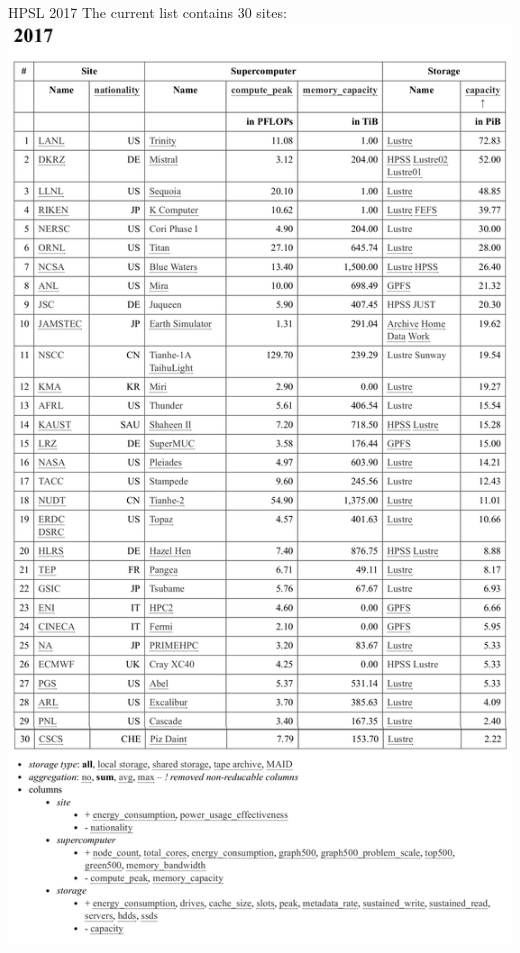 \documentclass[portrait,a0paper,fontscale=0.4]{baposter}
\begin{document}
\begin{poster}
\begin{posterbox}[name=engineering,column=3]{HPSL 2017}
The current list contains 30 sites:
\includegraphics[width=\textwidth]{hpsl-current}


\end{posterbox}
\end{poster}
\end{document}
